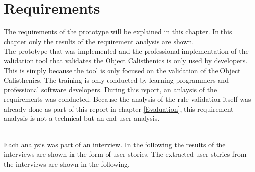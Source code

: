 \section{Requirements}
\label{p:requirements}
The requirements of the prototype will be explained in this chapter. In this chapter only the results of the requirement analysis are shown.
\\

The prototype that was implemented and the professional implementation of the validation tool that validates the Object Calisthenics is only used by developers. This is simply because the tool is only focused on the validation of the Object Calisthenics. The training is only conducted by learning programmers and professional software developers. During this report, an anlaysis of the requirements was conducted. Because the analysis of the rule validation itself was already done as part of this report in chapter \ref{Evaluation}, this requirement analysis is not a technical but an end user analysis. 

\\

Each analysis was part of an interview. In the following the results of the interviews are shown in the form of user stories. The extracted user stories from the interviews are shown in the following.
\\

